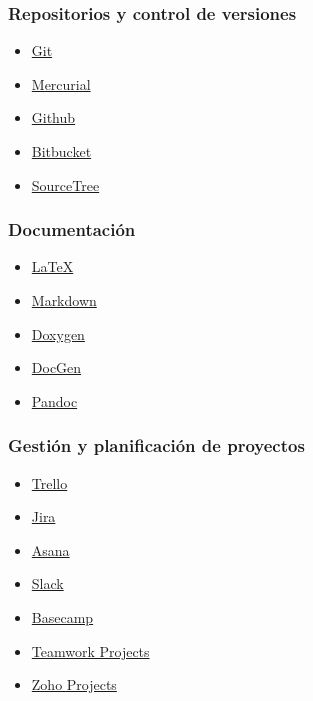 \subsubsection{Repositorios y control de versiones}
\begin{multicols}{2}
\begin{itemize}[nosep]
\item \href{https://git-scm.com/}{Git}
\item \href{https://www.mercurial-scm.org/}{Mercurial}
\item \href{https://github.com/}{Github}
\item \href{https://bitbucket.org/}{Bitbucket}
\item \href{https://www.sourcetreeapp.com/}{SourceTree}
\end{itemize}
\end{multicols}


\subsubsection{Documentación}
\begin{multicols}{2}
\begin{itemize}[nosep]
\item \href{https://www.latex-project.org/}{\LaTeX}
\item \href{https://markdown.es/}{Markdown}
\item \href{http://www.stack.nl/\%7Edimitri/doxygen/index.html}{Doxygen}
\item \href{http://mtmacdonald.github.io/docgen/docs/index.html}{DocGen}
\item \href{http://pandoc.org/}{Pandoc}
\end{itemize}
\end{multicols}



\subsubsection{Gestión y planificación de proyectos}
\begin{multicols}{2}
\begin{itemize}[nosep]
\item \href{https://trello.com/}{Trello}
\item \href{https://es.atlassian.com/software/jira}{Jira}
\item \href{https://asana.com/}{Asana}
\item \href{https://slack.com/}{Slack}
\item \href{https://basecamp.com/}{Basecamp}
\item \href{https://www.teamwork.com/project-management-software}{Teamwork Projects}
\item \href{https://www.zoho.com/projects/}{Zoho Projects}
\end{itemize}
\end{multicols}


